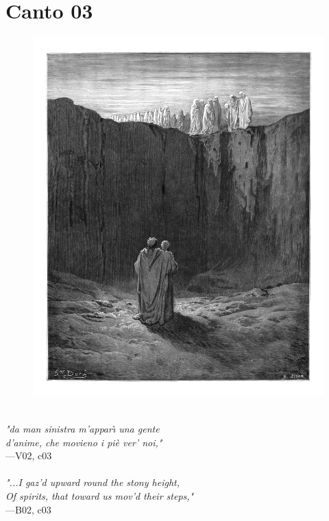 \documentclass[../Dore_vision.tex]{subfiles}
\begin{document}
\newpage

\section{Canto 03}

\begin{figure}[ht]
\centering
\includegraphics[height=\figsize]{illustrations/book_2/V02, c03.jpg}
\end{figure}

\begin{center}
\begin{minipage}{0.8\linewidth}
\textit{\\
"da man sinistra m’appar\`{\i} una gente\\d’anime, che movieno i piè ver’ noi,"} \\
—V02, c03 \\~\\
\textit{"...I gaz'd upward round the stony height,\\Of spirits, that toward us mov'd their steps,"} \\
—B02, c03
\end{minipage}
\end{center}
\end{document}
